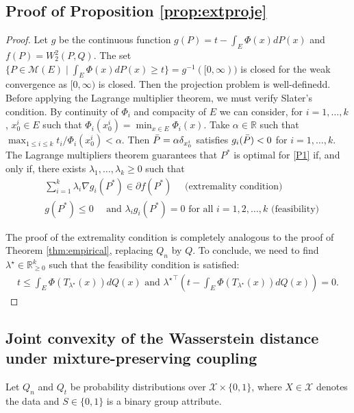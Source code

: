 \documentclass[runningheads, orivec]{llncs}
\newcommand{\R}{\mathbb{R}}
\begin{document}
\subsection{Proof of Proposition \ref{prop:extproje}}

\begin{proof}
Let $g$ be the continuous function $g(P) = t - \int_E \Phi(x)dP(x)$ and $f(P) = W_2^2(P,Q)$. The set $\{P\in\mathcal{M}(E)\mid \int_E \Phi(x)dP(x) \geq t\} = g^{-1}([0,\infty))$ is closed for the weak convergence as $[0,\infty)$ is closed. Then the projection problem is well-definedd. 
Before applying the Lagrange multiplier theorem, we must verify Slater's condition. By continuity of $\Phi_i$ and compacity of $E$ we can consider, for $i = 1, \ldots, k$, $x_0^i\in E$ such that $\Phi_i(x_0^i)=\min_{x\in E}\Phi_i(x)$. Take $\alpha\in\R$ such that $\max_{1\leq i \leq k}t_i/\Phi_i(x_0^i)<\alpha.$ Then $\Bar{P} = \alpha\delta_{x_0^i}$ satisfies $g_i(\Bar{P})<0$ for $i = 1, \ldots, k$. The Lagrange multipliers theorem guarantees that $P^*$ is optimal for \ref{P1} if, and only if, there exists $\lambda_1,\ldots,\lambda_k\geq0$ such that 
    \begin{align*}
        &\sum_{i=1}^k\lambda_i\nabla g_i(P^*)\in \partial f(P^*)\quad\text{ (extremality condition)}\\ 
        & g(P^*) \leq 0 \quad \text{ and } \lambda_ig_i(P^*)=0 \text{ for all } i = 1, 2, \ldots, k \text{ (feasibility)}
    \end{align*}

The proof of the extremality condition is completely analogous to the proof of Theorem \ref{thm:empirical}, replacing $Q_n$ by $Q$.
To conclude, we need to find $\lambda^\star\in\R^k_{\geq0}$ such that the feasibility condition is satisfied:
\begin{align}
    t \leq\int_E \Phi(T_{\lambda^\star}(x))dQ(x) \text{ and } {\lambda^\star}^\top\left(t-\int_E\Phi(T_{\lambda^\star}(x))dQ(x)\right) = 0.
\end{align}
\end{proof}

\subsection{Joint convexity of the Wasserstein distance under mixture-preserving coupling}\label{app:sec:proof_ineq}

Let \( Q_n \) and \( Q_t \) be probability distributions over \( \mathcal{X} \times \{0,1\} \), where \( X \in \mathcal{X} \) denotes the data and \( S \in \{0,1\} \) is a binary group attribute.
\end{document}
